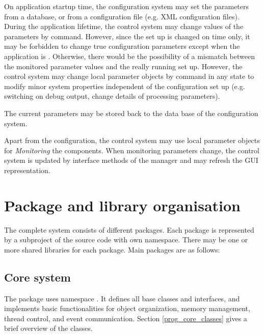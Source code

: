 On application startup time, the configuration system may 
      set the parameters from a database, or from a configuration file 
      (e.g. XML configuration files). During the application lifetime, the control system may change 
      values of the parameters by command. However, since the set 
      up is changed on  time only, it may be forbidden to change 
      true configuration parameters except when the application is . 
      Otherwise, there would be the possibility of a mismatch between the 
      monitored parameter values and the really running set up.
   However, the control system may change local parameter objects 
   by command in any state to modify minor system properties 
   independent of the configuration set up (e.g. switching on 
   debug output, change details of processing parameters).
      
The current parameters  may be stored back to the data 
base of the configuration system.

      
Apart from the configuration, 
the control system may use local parameter objects for 
{\sl Monitoring} the components. When monitoring parameters change, 
the control system is updated by interface methods of the 
manager and may refresh the GUI representation.



\section{Package and library organisation}
The complete system consists of different packages. 
Each package is represented by a subproject of the source code with own namespace. 
There may be one or more shared libraries for each package. Main packages are as follows: 

\subsection{Core system}
The  package uses namespace .
It defines all base classes and interfaces, 
and implements basic functionalities for object organization, memory management, 
thread control, and event communication. Section \ref{prog_core_classes} gives a brief overview of the
  classes.
   

